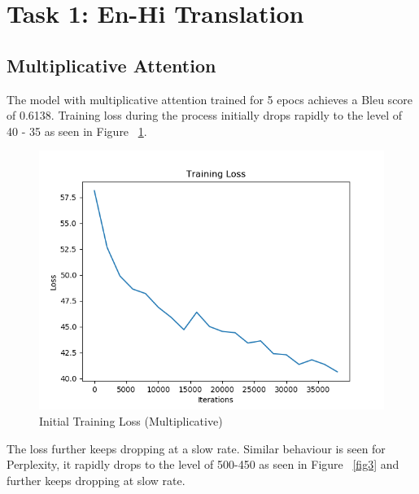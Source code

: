 \documentclass[11pt,a4paper]{article}
\begin{document}
\section{Task 1: En-Hi Translation}


\subsection{Multiplicative Attention}
The model with multiplicative attention trained for 5 epocs achieves a Bleu score of 0.6138.
Training loss during the process initially drops rapidly to the level of 40 - 35 as seen in Figure ~\ref{fig1}. 

\begin{figure}[!htbp]
\includegraphics[width=\linewidth]{hi_mul_loss_1.png}
\caption{Initial Training Loss (Multiplicative)}
\label{fig1}
\end{figure}

The loss further keeps dropping at a slow rate. Similar behaviour is seen for Perplexity, it rapidly drops to the level of 500-450 as seen in Figure ~\ref{fig3} and further keeps dropping at slow rate.

\end{document}
